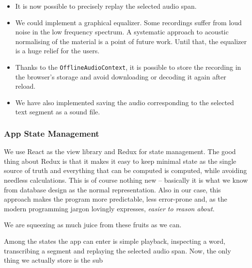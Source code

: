\documentclass{llncs}
\begin{document}
\begin{itemize}
\item{It is now possible to precisely replay the selected audio span.}
\item{
    We could implement a graphical equalizer. Some recordings suffer from loud
    noise in the low frequency spectrum. A systematic approach to acoustic
    normalising of the material is a point of future work. Until that, the
    equalizer is a huge relief for the users.
}
\item{
    Thanks to the \texttt{OfflineAudioContext}, it is possible to store the
    recording in the browser's storage and avoid downloading or decoding it
    again after reload.
}
\item{
    We have also implemented saving the audio corresponding to the selected text
    segment as a sound file.
}
\end{itemize}

\subsubsection{App State Management}

We use React as the view library and Redux for state management. The good thing
about Redux is that it makes it easy to keep minimal state as the single source
of truth and everything that can be computed is computed, while avoiding
needless calculations. This is of course nothing new -- basically it is what we
know from database design as the normal representation. Also in our case, this
approach makes the program more predictable, less error-prone and, as the modern
programming jargon lovingly expresses, {\em easier to reason about}.

We are squeezing as much juice from these fruits as we can.

Among the states the app can enter is simple playback, inspecting a word,
transcribing a segment and replaying the selected audio span. Now, the only
thing we actually store is the sub


\end{document}
